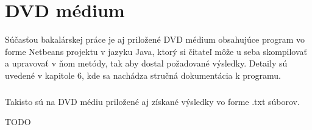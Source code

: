 \chapter{DVD médium}

Súčasťou bakalárskej práce je aj priložené DVD médium obsahujúce program vo forme Netbeans projektu v jazyku Java, ktorý si čitateľ môže u seba skompilovať a upravovať v ňom metódy, tak aby dostal požadované výsledky. Detaily sú uvedené v kapitole 6, kde sa nachádza stručná dokumentácia k programu.
\paragraph{}
Takisto sú na DVD médiu priložené aj získané výsledky vo forme .txt súborov.

TODO